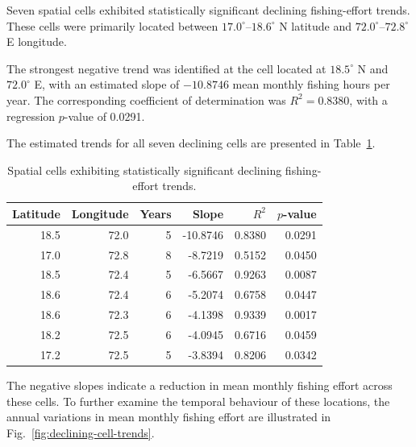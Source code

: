 \documentclass[pdflatex,sn-mathphys-num]{sn-jnl}
\theoremstyle{thmstyleone}
\theoremstyle{thmstyletwo}
\theoremstyle{thmstylethree}
\begin{document}
Seven spatial cells exhibited statistically
significant declining fishing-effort trends.
These cells were primarily located between
$17.0^\circ$--$18.6^\circ$ N latitude and
$72.0^\circ$--$72.8^\circ$ E longitude.

The strongest negative trend was identified
at the cell located at $18.5^\circ$ N and
$72.0^\circ$ E, with an estimated slope of
$-10.8746$ mean monthly fishing hours per year.
The corresponding coefficient of determination
was $R^2 = 0.8380$, with a regression
$p$-value of 0.0291.

The estimated trends for all seven declining
cells are presented in Table~\ref{tab:declining-cells}.

\begin{table}[!htbp]
\centering
\caption{Spatial cells exhibiting statistically
significant declining fishing-effort trends.}
\label{tab:declining-cells}
\small
\begin{tabular}{rrrrrr}
\toprule
Latitude & Longitude & Years & Slope & $R^2$ & $p$-value \\
\midrule
18.5 & 72.0 & 5 & -10.8746 & 0.8380 & 0.0291 \\
17.0 & 72.8 & 8 & -8.7219 & 0.5152 & 0.0450 \\
18.5 & 72.4 & 5 & -6.5667 & 0.9263 & 0.0087 \\
18.6 & 72.4 & 6 & -5.2074 & 0.6758 & 0.0447 \\
18.6 & 72.3 & 6 & -4.1398 & 0.9339 & 0.0017 \\
18.2 & 72.5 & 6 & -4.0945 & 0.6716 & 0.0459 \\
17.2 & 72.5 & 5 & -3.8394 & 0.8206 & 0.0342 \\
\bottomrule
\end{tabular}
\end{table}

The negative slopes indicate a reduction in
mean monthly fishing effort across these cells.
To further examine the temporal behaviour of
these locations, the annual variations in
mean monthly fishing effort are illustrated
in Fig.~\ref{fig:declining-cell-trends}.
\end{document}
